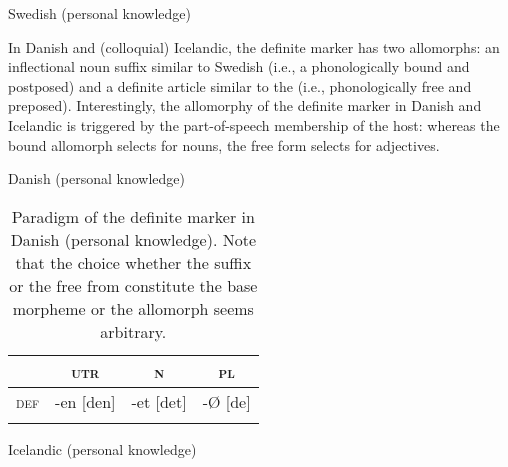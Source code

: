 {%
\begin{exe}
\ex \rm{Swedish (personal knowledge)}
\begin{xlist}
\end{xlist}
\end{exe}
In Danish and (colloquial) Icelandic, the definite marker has two allomorphs: an inflectional noun suffix similar to Swedish (i.e., a phonologically bound and postposed) and a definite article similar to the  (i.e., phonologically free and preposed). Interestingly, the allomorphy of the definite marker in Danish and Icelandic is triggered by the part-of-speech membership of the host: whereas the bound allomorph selects for nouns, the free form selects for adjectives.
\begin{exe}
\ex \rm{Danish (personal knowledge)}
\begin{xlist}
\end{xlist}
\end{exe}
\begin{table}
\begin{tabular}{lccc}
\lsptoprule
			&\textsc{utr}	&\textsc{n}		&\textsc{pl}\\
\midrule
\textsc{def}	&-en [den]		&-et [det]			&-{Ø} [de]\\
\lspbottomrule
\end{tabular}
\caption[Paradigm of \textsc{def} in Danish]{Paradigm of the definite marker in Danish (personal knowledge). Note that the choice whether the suffix or the free from constitute the base morpheme or the allomorph seems arbitrary.}
\label{danish defallomorph}
\end{table}
\begin{exe}
\ex \rm{Icelandic (personal knowledge)}
\begin{xlist}
\end{xlist}
\end{exe}

}

